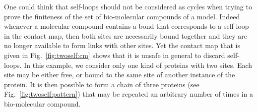 \documentclass{entcs}
\begin{document}
One could think that self-loops should not be considered as cycles when trying to prove the finiteness of the set of bio-molecular compounds of a model. Indeed whenever a molecular compound contains a bond that corresponds to a self-loop in the contact map, then both sites are necessarily  bound together and they are no longer available to form links with other sites. Yet the contact map that is given in Fig.~\ref{fig:twoself:cm} shows that it is unsafe in general to discard self-loops. In this example, we consider only one kind of proteins with two sites. Each site may be either free, or bound to the same site of another instance of the protein. It is then possible to form a chain of three proteins (see Fig.~\ref{fig:twoself:pattern}) that may be repeated an arbitrary number of times in a bio-molecular compound.
\end{document}
